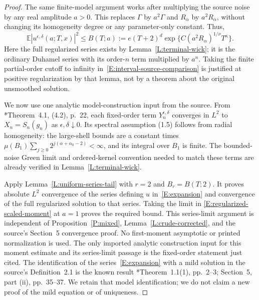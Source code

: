 \documentclass[12pt]{article}
\numberwithin{equation}{section}
\theoremstyle{definition}
\newcommand{\E}{\mathbb{E}}
\begin{document}
\begin{proof}
  The same finite-model argument works after multiplying the source
  noise by any real amplitude $a>0$. This replaces $\Gamma$ by
  $a^2\Gamma$ and $R_\alpha$ by $a^2R_\alpha$, without changing its
  homogeneity degree or any parameter-only constant. Thus,
  \begin{equation}\label{E:regularized-scaled-moment}
    \E|u^{\epsilon,\delta}(a;T,x)|^2
    \le B(T;a):=e(T+2)^d
    \exp\{C(a^2R_\alpha)^{1/\nu}T^\kappa\}.
  \end{equation}
  Here the full regularized series exists by
  Lemma~\ref{L:terminal-wick}; it is the ordinary Duhamel series with
  its order-$n$ term multiplied by $a^n$. Taking the finite partial-order
  cutoff to infinity in~\eqref{E:interval-source-comparison} is justified
  at positive regularization by that lemma, not by a theorem about the
  original unsmoothed solution.

  We now use one analytic model-construction input from the source.
  From \cite{chen:author2026:time-dependency}*{Theorem~4.1, (4.2), p.~22},
  each fixed-order term $Y_n^{\epsilon,\delta}$ converges in $L^2$ to
  $X_n=S_n(g_n)$ as $\epsilon,\delta\downarrow0$.
  Its spectral assumption (1.5) follows from radial homogeneity: the
  large-shell bounds are a constant times
  $\mu(B_1)\sum_{j\ge0}2^{j(\alpha+\alpha_0-2)}<\infty$,
  and its integral over $B_1$ is finite.
  The bounded-noise Green limit and ordered-kernel convention needed
  to match these terms are already verified in
  Lemma~\ref{L:terminal-wick}.

  Apply Lemma~\ref{L:uniform-series-tail} with $r=2$ and
  $B_r=B(T;2)$. It proves absolute $L^2$ convergence of the series
  defining $u$ in~\eqref{E:expansion} and convergence of the full
  regularized solution to that series. Taking the limit in
  \eqref{E:regularized-scaled-moment} at $a=1$ proves the required bound.
  This series-limit argument is independent of
  Proposition~\ref{P:mixed}, Lemma~\ref{L:crude-corrected}, and the
  source's Section~5 convergence proof. No first-moment asymptotic or
  printed normalization is used. The only imported analytic construction
  input for this moment estimate and its series-limit passage is the
  fixed-order statement just cited.
  The identification of the series~\eqref{E:expansion} with a mild
  solution in the source's Definition~2.1 is the known result
  \cite{chen:author2026:time-dependency}*{Theorem~1.1(1), pp.~2--3;
  Section~5, part (ii), pp.~35--37}. We retain that model identification; we do not
  claim a new proof of the mild equation or of uniqueness.


\end{proof}
\end{document}
